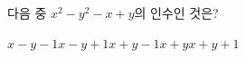 다음 중 $x^2-y^2-x+y$의 인수인 것은?
\begin{choices32}{$x-y-1$}{$x-y+1$}{$x+y-1$}{$x+y$}{$x+y+1$}\end{choices32}

